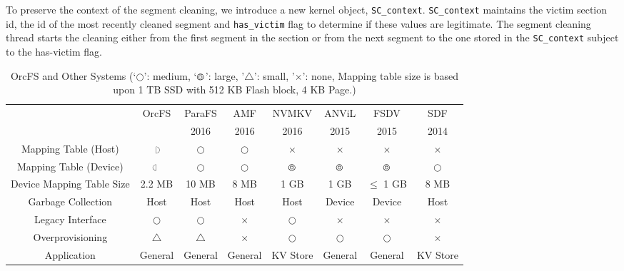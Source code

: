 \documentclass[pageno]{jpaper}
\begin{document}
To preserve the context of the segment cleaning, we introduce a new
kernel object, \texttt{SC\_context}. \texttt{SC\_context} maintains
the victim section id, the id of the most recently cleaned segment and
\texttt{has\_victim} flag to determine if these values are
legitimate. The segment cleaning thread starts the cleaning either from
the first segment in the section or from the next segment to the one
stored in the \texttt{SC\_context} subject to the has-victim flag.



\begin{table}[t]
  \begin{center}
  \begin{tabular}{|c|c|c|c|c|c|c|c|} \hline
  						& OrcFS 			& ParaFS \cite{zhang2016parafs}	& AMF \cite{lee2016application} & NVMKV \cite{nvmkv} & ANViL \cite{anvil} & FSDV \cite{zhangremoving} & SDF \cite{sdf}	\\
  						& 	 			& 2016					& 2016 		& 2016		& 2015 			& 2015		  	& 2014			\\ \hline \hline
  Mapping Table (Host) 	& $\Rightcircle$ 	& $\Circle$				& $\Circle$ 	& $\times$ 	& $\times$ 		& $\times$ 		& $\times$ 		\\ \hline
  Mapping Table (Device) 	& $\Leftcircle$ 	& $\Circle$				& $\Circle$	& $\varocircle$ 	& $\varocircle$ 		& $\varocircle$ 		& $\Circle$ 		\\ \hline
  Device Mapping Table Size	& 2.2 MB	 		& 10 MB					& 8 MB 		& 1 GB 		& 1 GB 			& $\leq$ 1 GB 	& 8 MB			\\ \hline
  Garbage Collection		& Host 			& Host 					& Host 		& Host 		& Device 			& Device 			& Host 			\\ \hline
  Legacy Interface  		& $\Circle$ 		& $\Circle$				& $\times$ 	& $\Circle$ 	& $\times$  		& $\times$ 		& $\times$ 		\\ \hline
  Overprovisioning 		& $\triangle$ 	& $\triangle$ 			& $\times$ 	& $\Circle$ 	& $\Circle$ 		& $\Circle$ 		& $\times$ 		\\ \hline
  Application 			& General 		& General					& General 	& KV Store 	& General 		& General 		& KV Store 		\\ \hline
  \end{tabular}
  \end{center}
    \caption{OrcFS and Other Systems (`$\Circle$': medium,
  `$\varocircle$': large, '$\triangle$': small, '$\times$': none,
  Mapping table size is based upon 1 TB SSD with 512 KB Flash block, 4
  KB Page.)} 
  \label{tab:compare_usl}
\end{table}
\end{document}
